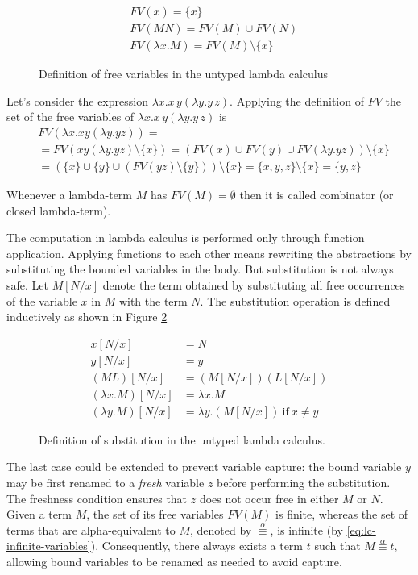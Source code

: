 \begin{figure}[htpb]
    \begin{align*}
    &FV(x)=\{x\} \\
    &FV(MN)=FV(M) \cup FV(N) \\
    &FV(\lambda x.M)=FV(M) \setminus \{x\}
    \end{align*}
    \caption{Definition of free variables in the untyped lambda calculus}
    \label{fig:untyped-lambda calculus-free-variables}
\end{figure}


Let's consider the expression $\lambda x.x\,y(\lambda y.y\,z)$. Applying the definition of $FV$ the set of the free variables of $\lambda x.x\,y(\lambda y.y\,z)$ is
\begin{align*}
&FV(\lambda x.xy(\lambda y.yz)) = \\
&= FV(xy(\lambda y.yz) \setminus \{x\}) = (FV(x) \cup FV(y) \cup FV(\lambda y.yz)) \setminus \{x\} \\ 
&= (\{x\} \cup \{y\} \cup (FV(yz) \setminus \{y\})) \setminus \{x\} = \{x,y,z\} \setminus \{x\} = \{y,z\}
\end{align*}

Whenever a lambda-term $M$ has $FV(M)=\emptyset$ then it is called combinator (or closed lambda-term).

The computation in lambda calculus is performed only through function application. Applying functions to each other means rewriting the abstractions by substituting the bounded variables in the body. But substitution is not always safe. Let $M[N/x]$ denote the term obtained by substituting all free occurrences of the variable $x$ in $M$ with the term $N$. The substitution operation is defined inductively as shown in Figure \ref{fig:untyped-lambda calculus-substitution}
\begin{figure}[htpb]
    \begin{align*}
        x[N/x]&=N \\
        y[N/x]&=y \\
        (ML)[N/x]&=(M[N/x])(L[N/x]) \\
        (\lambda x.M)[N/x]&=\lambda x.M \\
        (\lambda y.M)[N/x]&=\lambda y.(M[N/x]) \ \text{if} \ x \neq y
    \end{align*}
    \caption{Definition of substitution in the untyped lambda calculus.}
    \label{fig:untyped-lambda calculus-substitution}
\end{figure}
The last case could be extended to prevent variable capture: the bound variable $y$ may be first renamed to a \textit{fresh} variable $z$ before performing the substitution. The freshness condition ensures that $z$ does not occur free in either $M$ or $N$. Given a term $M$, the set of its free variables $FV(M)$ is finite, whereas the set of terms that are alpha-equivalent to $M$, denoted by $\stackrel{\alpha}{\equiv}$, is infinite (by \ref{eq:lc-infinite-variables}). Consequently, there always exists a term $t$ such that $M \stackrel{\alpha}{\equiv} t$, allowing bound variables to be renamed as needed to avoid capture.


